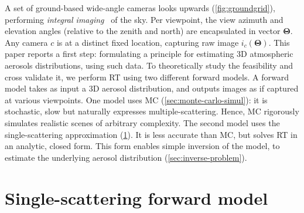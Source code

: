 \documentclass[10pt,letterpaper]{article}
\begin{document}
A set of ground-based wide-angle cameras looks upwards
(\cref{fig:groundgrid}), performing {\em integral
  imaging}~\cite{Hong2004} of the sky. Per viewpoint, the view azimuth
and elevation angles (relative to the zenith and north) are
encapsulated in vector ${\bm{\Theta}}$. Any camera $c$ is at a
distinct fixed location, capturing raw image
$i_c({\bm{\Theta}})$. This paper reports a first step: formulating a
principle for estimating 3D atmospheric aerosols distributions, using
such data. To theoretically study the feasibility and cross validate
it, we perform RT using two different forward models. A forward model
takes as input a 3D aerosol distribution, and outputs images as if
captured at various viewpoints.  One model uses MC
(\cref{sec:monte-carlo-simul}): it is stochastic, slow but
naturally expresses multiple-scattering. Hence, MC rigorously
simulates realistic scenes of arbitrary complexity.
The second model uses the single-scattering approximation
(\cref{sec:single-scatt-model}). It is less accurate than MC, but
solves RT in an analytic, closed form. This form enables simple
inversion of the model, to estimate the underlying aerosol
distribution (\cref{sec:inverse-problem}).


\section{Single-scattering forward model}
\label{sec:single-scatt-model}
\end{document}
